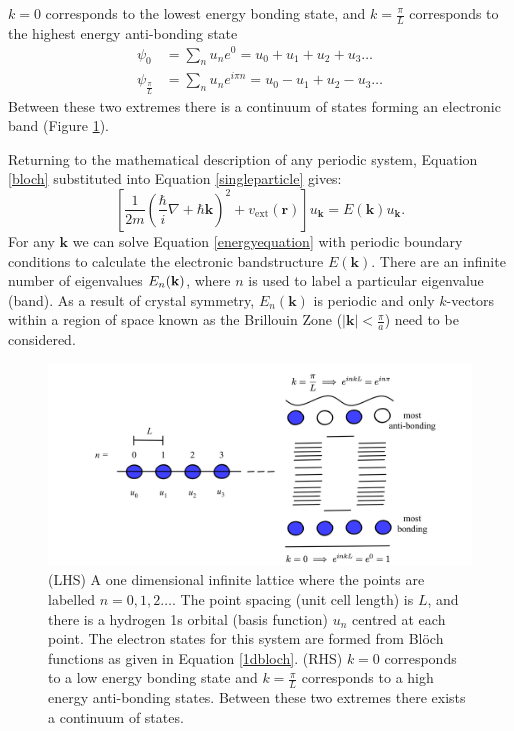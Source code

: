 $k=0$ corresponds to the lowest energy bonding state, and $k=\frac{\pi}{L}$ corresponds to the highest energy anti-bonding state
\begin{align}
\psi_0 &= \sum_nu_ne^0 = u_0 +u_1 +u_2 +u_3 \dots \\
\psi_{\frac{\pi}{L}} &= \sum_nu_ne^{i\pi n} = u_0 -u_1+u_2-u_3 \dots
\end{align}
Between these two extremes there is a continuum of states forming an electronic band (Figure \ref{bands}). 

Returning to the mathematical description of any periodic system, Equation \ref{bloch} substituted into Equation \ref{singleparticle} gives:
\begin{equation} \label{energyequation}
\left[\frac{1}{2m}\left(\frac{\hbar}{i}\nabla+\hbar \textbf{k}\right)^2+v_\textrm{ext}(\textbf{r})\right]u_\textbf{k} = E(\textbf{k})u_\textbf{k}.
\end{equation}
For any $\textbf{k}$ we can solve Equation \ref{energyequation} with periodic boundary conditions to calculate the electronic bandstructure $E(\textbf{k})$. There are an infinite number of eigenvalues $E_n(\textbf{\textbf{k}})$, where $n$ is used to label a particular eigenvalue (band). As a result of crystal symmetry, $E_n(\textbf{k})$ is periodic and only $k$-vectors within a region of space known as the Brillouin Zone ($|\textbf{k}|<\frac{\pi}{a}$) need to be considered.\autocite{Lundstrom2000} 

\begin{figure}[h]
\centering
  \includegraphics[width=1.0\columnwidth]{figures/ch3/bands.png}
  \caption[Bonding and anti-bonding states in an infinite 1D crystal]{(LHS) A one dimensional infinite lattice where the points are labelled $n=0,1,2\ldots$. The point spacing (unit cell length) is $L$, and there is a hydrogen 1s orbital (basis function) $u_n$ centred at each point. The electron states for this system are formed from Bl\"{o}ch functions as given in Equation \ref{1dbloch}. (RHS) $k=0$ corresponds to a low energy bonding state and $k=\frac{\pi}{L}$ corresponds to a high energy anti-bonding states. Between these two extremes there exists a continuum of states.} 
  \label{bands}
\end{figure}

